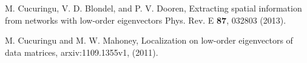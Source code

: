 \documentclass[envcountreset,oribibl]{llncs}
\begin{document}
\begin{thebibliography}{0}





 M. Cucuringu, V. D. Blondel, and P. V. Dooren, Extracting spatial information from networks with low-order eigenvectors
Phys. Rev. E {\bf 87}, 032803 (2013).

 M. Cucuringu and M. W. Mahoney, Localization on low-order eigenvectors of data matrices, arxiv:1109.1355v1, (2011).







\end{thebibliography}
\end{document}

